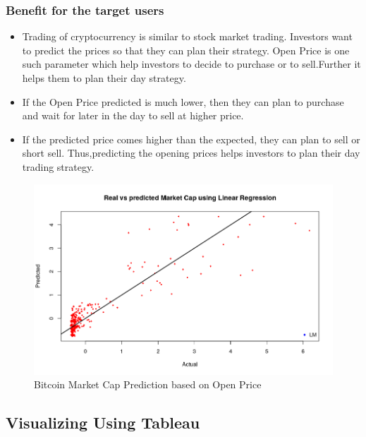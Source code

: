 \documentclass{article}
\begin{document}
\subsubsection {Benefit for the target users}
\begin{itemize}
\item Trading of cryptocurrency is similar to stock market trading. Investors want to predict the prices so that they can plan their strategy. Open Price is one such parameter which help investors to decide to purchase or to sell.Further it helps them to plan their day strategy. 
\item If the Open Price predicted is much lower, then they can plan to purchase and wait for later in the day to sell at higher price.
\item If the predicted price comes higher than the expected, they can plan to sell or short sell. Thus,predicting the opening prices helps investors to plan their day trading strategy.
\end{itemize}
\begin{figure}
	\centering
	\includegraphics[width=\linewidth]{MarketCapLR}
	\caption{Bitcoin Market Cap Prediction based on Open Price}
	\label{fig1:MarketCapLR}
\end{figure}
\newpage

\subsection {Visualizing Using Tableau}
\end{document}
